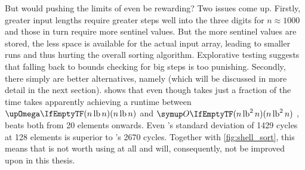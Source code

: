 But would pushing the limits of \ShS{} even be rewarding?
Two issues come up.
Firstly, greater input lengths require greater steps \Dash well into the three digits for \(n \approx 1000\) \cite{skean2023optimization, 10.1007/3-540-44669-9_12} \Dash and those in turn require more sentinel values.
But the more sentinel values are stored, the less space is available for the actual input array, leading to smaller runs and thus hurting the overall sorting algorithm.
Explorative testing suggests that falling back to bounds checking for big steps is too punishing.
Secondly, there simply are better alternatives, namely \QS{} (which will be discussed in more detail in the next section).
 shows that even though \ShS{} takes just a fraction of the time \IS{} takes \Dash apparently achieving a runtime between \(\bigomega{n \lb n}\) and \(\bigoh{n \lb^2 n}\) \Dash\negthinspace, \QS{} beats both from 20 elements onwards.
Even \QS{}'s standard deviation of 1429 cycles at 128 elements is superior to \ShS{}'s 2670 cycles.
Together with \cref{fig:shell_sort}, this means that \ShS{} is not worth using at all and will, consequently, not be improved upon in this thesis.
